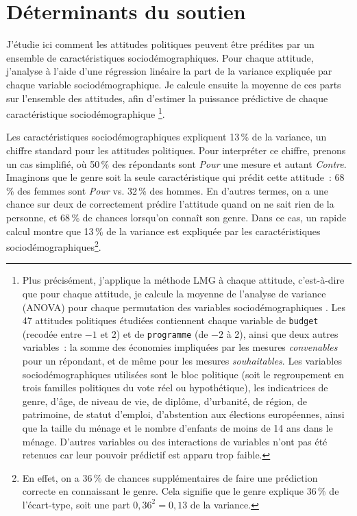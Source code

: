 \documentclass[12pt,french]{article}
\begin{document}
\section{Déterminants du soutien}
\label{sec:determinants}

J'étudie ici comment les attitudes politiques peuvent être prédites par un ensemble de caractéristiques sociodémographiques. Pour chaque attitude, j'analyse à l'aide d'une régression linéaire la part de la variance expliquée par chaque variable sociodémographique. Je calcule ensuite la moyenne de ces parts sur l'ensemble des attitudes, afin d'estimer la puissance prédictive de chaque caractéristique sociodémographique%
\footnote{Plus précisément, j'applique la méthode LMG à chaque attitude, c'est-à-dire que pour chaque attitude, je calcule la moyenne de l'analyse de variance (ANOVA) pour chaque permutation des variables sociodémographiques \citep{lindeman_introduction_1980,gromping_estimators_2007}. Les 47 attitudes politiques étudiées contiennent chaque variable de \texttt{budget} (recodée entre $-1$ et 2) et de \texttt{programme} (de $-2$ à 2), ainsi que deux autres variables~: la somme des économies impliquées par les mesures \textit{convenables} pour un répondant, et de même pour les mesures \textit{souhaitables}. Les variables sociodémographiques utilisées sont le bloc politique (soit le regroupement en trois familles politiques du vote réel ou hypothétique), les indicatrices de genre, d'âge, de niveau de vie, de diplôme, d'urbanité, de région, de patrimoine, de statut d'emploi, d'abstention aux élections européennes, ainsi que la taille du ménage et le nombre d'enfants de moins de 14 ans dans le ménage. D'autres variables ou des interactions de variables n'ont pas été retenues car leur pouvoir prédictif est apparu trop faible.}.


Les caractéristiques sociodémographiques expliquent 13\,\% de la variance, un chiffre standard pour les attitudes politiques. Pour interpréter ce chiffre, prenons un cas simplifié, où 50\,\% des répondants sont \textit{Pour} une mesure et autant \textit{Contre}. Imaginons que le genre soit la seule caractéristique qui prédit cette attitude~: 68\,\% des femmes sont \textit{Pour} vs. 32\,\% des hommes. En d'autres termes, on a une chance sur deux de correctement prédire l'attitude quand on ne sait rien de la personne, et 68\,\% de chances lorsqu'on connaît son genre. Dans ce cas, un rapide calcul montre que 13\,\% de la variance est expliquée par les caractéristiques sociodémographiques\footnote{En effet, on a 36\,\% de chances supplémentaires de faire une prédiction correcte en connaissant le genre. Cela signifie que le genre explique 36\,\% de l'écart-type, soit une part $0,36^2=0,13$ de la variance.}.
\end{document}
